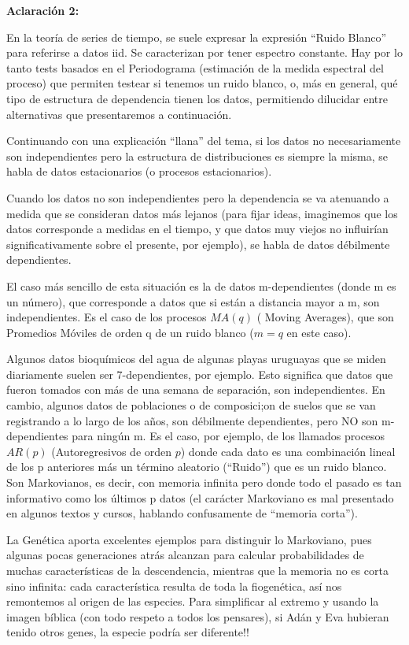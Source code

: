 \documentclass[
  oneside]{book}
\begin{document}
\textbf{Aclaración 2:}

En la teoría de series de tiempo, se suele expresar la expresión ``Ruido
Blanco'' para referirse a datos iid. Se caracterizan por tener espectro
constante. Hay por lo tanto tests basados en el Periodograma (estimación
de la medida espectral del proceso) que permiten testear si tenemos un
ruido blanco, o, más en general, qué tipo de estructura de dependencia
tienen los datos, permitiendo dilucidar entre alternativas que
presentaremos a continuación.

Continuando con una explicación ``llana'' del tema, si los datos no
necesariamente son independientes pero la estructura de distribuciones
es siempre la misma, se habla de datos estacionarios (o procesos
estacionarios).

Cuando los datos no son independientes pero la dependencia se va
atenuando a medida que se consideran datos más lejanos (para fijar
ideas, imaginemos que los datos corresponde a medidas en el tiempo, y
que datos muy viejos no influirían significativamente sobre el presente,
por ejemplo), se habla de datos débilmente dependientes.

El caso más sencillo de esta situación es la de datos m-dependientes
(donde m es un número), que corresponde a datos que si están a distancia
mayor a m, son independientes. Es el caso de los procesos \(MA(q)\) (
Moving Averages), que son Promedios Móviles de orden q de un ruido
blanco (\(m=q\) en este caso).

Algunos datos bioquímicos del agua de algunas playas uruguayas que se
miden diariamente suelen ser 7-dependientes, por ejemplo. Esto significa
que datos que fueron tomados con más de una semana de separación, son
independientes. En cambio, algunos datos de poblaciones o de
composici;on de suelos que se van registrando a lo largo de los años,
son débilmente dependientes, pero NO son m-dependientes para ningún m.
Es el caso, por ejemplo, de los llamados procesos \(AR(p)\)
(Autoregresivos de orden \(p\)) donde cada dato es una combinación
lineal de los p anteriores más un término aleatorio (``Ruido'') que es
un ruido blanco. Son Markovianos, es decir, con memoria infinita pero
donde todo el pasado es tan informativo como los últimos p datos (el
carácter Markoviano es mal presentado en algunos textos y cursos,
hablando confusamente de ``memoria corta'').

La Genética aporta excelentes ejemplos para distinguir lo Markoviano,
pues algunas pocas generaciones atrás alcanzan para calcular
probabilidades de muchas características de la descendencia, mientras
que la memoria no es corta sino infinita: cada característica resulta de
toda la fiogenética, así nos remontemos al origen de las especies. Para
simplificar al extremo y usando la imagen bíblica (con todo respeto a
todos los pensares), si Adán y Eva hubieran tenido otros genes, la
especie podría ser diferente!!
\end{document}
